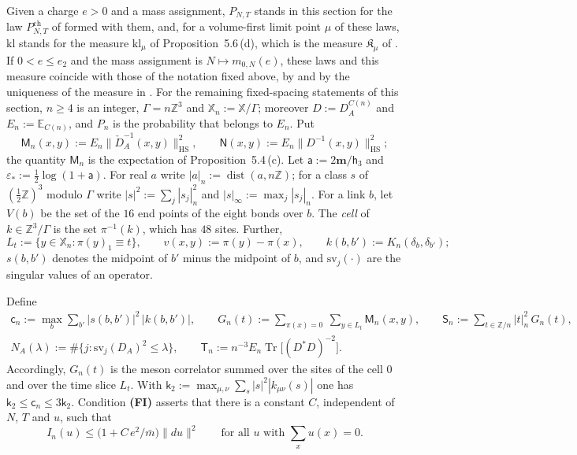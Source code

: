 \documentclass[11pt]{amsart}
\theoremstyle{definition}
\begin{document}
Given a charge $e>0$ and a mass assignment, $P_{N,T}$ stands in this section for the law $P^{\mathrm{ch}}_{N,T}$ of \cite[Section~1.2]{QEDII} formed with them, and, for a volume-first limit point $\mu$ of these laws, $\mathrm{kl}$ stands for the measure $\mathrm{kl}_\mu$ of Proposition~5.6\,(d), which is the measure $\mathfrak K_\mu$ of \cite[Theorem~1.4, Part~I\,(d)]{QEDII}.
If $0<e\le e_2$ and the mass assignment is $N\mapsto m_{0,N}(e)$, these laws and this measure coincide with those of the notation fixed above, by \cite[Section~I.7.5]{QEDIII} and by the uniqueness of the measure in \cite[Theorem~44\,(C7)]{QEDIII}.
For the remaining fixed-spacing statements of this section, $n\ge4$ is an integer, $\Gamma=n\mathbb Z^3$ and $\mathbb X_n:=\mathbb X/\Gamma$; moreover $D:=D^{C(n)}_A$ and $E_n:=\mathbb E_{C(n)}$, and $P_n$ is the probability that belongs to $E_n$.
Put
\begin{equation*}
\mathsf M_n(x,y):=E_n\|\check D_A^{-1}(x,y)\|^2_{\mathrm{HS}},\qquad\mathsf N(x,y):=E_n\|D^{-1}(x,y)\|^2_{\mathrm{HS}};
\end{equation*}
the quantity $\mathsf M_n$ is the expectation of Proposition~5.4\,(c).
Let $\mathsf a:=2\mathbf m/\mathsf h_3$ and $\varepsilon_*:=\frac12\log(1+\mathsf a)$.
For real $a$ write $|a|_n:=\operatorname{dist}(a,n\mathbb Z)$; for a class $s$ of $(\frac12\mathbb Z)^3$ modulo $\Gamma$ write $|s|^2:=\sum_j|s_j|_n^2$ and $|s|_\infty:=\max_j|s_j|_n$.
For a link $b$, let $V(b)$ be the set of the $16$ end points of the eight bonds over $b$.
The \emph{cell} of $k\in\mathbb Z^3/\Gamma$ is the set $\pi^{-1}(k)$, which has $48$ sites.
Further,
\begin{equation*}
L_t:=\{y\in\mathbb X_n:\pi(y)_1\equiv t\},\qquad v(x,y):=\pi(y)-\pi(x),\qquad k(b,b'):=K_n(\delta_b,\delta_{b'});
\end{equation*}
$s(b,b')$ denotes the midpoint of $b'$ minus the midpoint of $b$, and $\mathrm{sv}_j(\cdot)$ are the singular values of an operator.

Define
\begin{gather*}
\mathsf c_n:=\max_b\sum_{b'}|s(b,b')|^2\,|k(b,b')|,\qquad G_n(t):=\sum_{\pi(x)=0}\ \sum_{y\in L_t}\mathsf M_n(x,y),\qquad\mathsf S_n:=\sum_{t\in\mathbb Z/n}|t|_n^2\,G_n(t),\\
N_A(\lambda):=\#\{j:\mathrm{sv}_j(D_A)^2\le\lambda\},\qquad\mathsf T_n:=n^{-3}E_n\operatorname{Tr}\bigl[(D^*D)^{-2}\bigr].
\end{gather*}
Accordingly, $G_n(t)$ is the meson correlator summed over the sites of the cell $0$ and over the time slice $L_t$.
With $\mathsf k_2:=\max_{\mu,\nu}\sum_s|s|^2|k_{\mu\nu}(s)|$ one has $\mathsf k_2\le\mathsf c_n\le3\mathsf k_2$.
Condition \textbf{(FI)} asserts that there is a constant $C$, independent of $N$, $T$ and $u$, such that
\begin{equation*}
I_n(u)\le\bigl(1+C\,e^2/\bar m\bigr)\|du\|^2\qquad\text{for all $u$ with $\sum_xu(x)=0$.}
\end{equation*}
\end{document}
